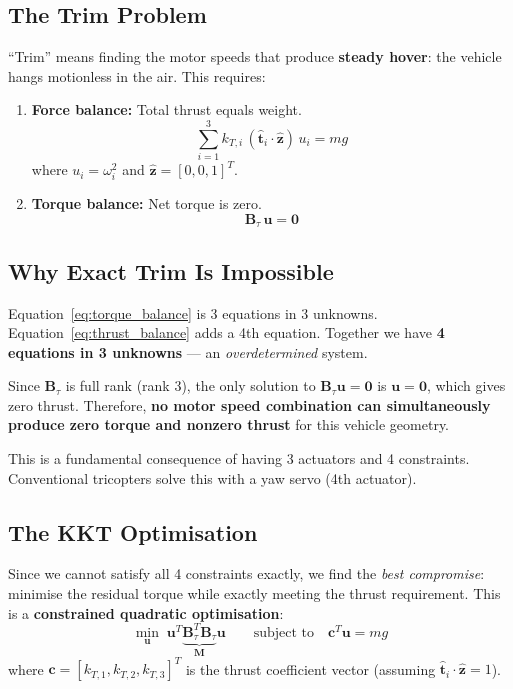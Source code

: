 \documentclass[12pt, a4paper]{article}
\newcommand{\bu}{\bm{u}}
\newcommand{\bB}{\bm{B}}
\begin{document}
\subsection{The Trim Problem}

``Trim'' means finding the motor speeds that produce \textbf{steady hover}: the vehicle hangs motionless in the air.  This requires:
\begin{enumerate}
    \item \textbf{Force balance:} Total thrust equals weight.
    \begin{equation}
        \sum_{i=1}^{3} k_{T,i} \, (\hat{\bm{t}}_i \cdot \hat{\bm{z}}) \, u_i = m g
        \label{eq:thrust_balance}
    \end{equation}
    where $u_i = \omega_i^2$ and $\hat{\bm{z}} = [0,0,1]^T$.

    \item \textbf{Torque balance:} Net torque is zero.
    \begin{equation}
        \bB_\tau \, \bu = \bm{0}
        \label{eq:torque_balance}
    \end{equation}
\end{enumerate}

\subsection{Why Exact Trim Is Impossible}

Equation~\eqref{eq:torque_balance} is 3 equations in 3 unknowns.  Equation~\eqref{eq:thrust_balance} adds a 4th equation.  Together we have \textbf{4 equations in 3 unknowns} --- an \emph{overdetermined} system.

Since $\bB_\tau$ is full rank (rank 3), the only solution to $\bB_\tau \bu = \bm{0}$ is $\bu = \bm{0}$, which gives zero thrust.  Therefore, \textbf{no motor speed combination can simultaneously produce zero torque and nonzero thrust} for this vehicle geometry.

This is a fundamental consequence of having 3 actuators and 4 constraints.  Conventional tricopters solve this with a yaw servo (4th actuator).

\subsection{The KKT Optimisation}

Since we cannot satisfy all 4 constraints exactly, we find the \emph{best compromise}: minimise the residual torque while exactly meeting the thrust requirement.  This is a \textbf{constrained quadratic optimisation}:
\begin{equation}
    \min_{\bu} \; \bu^T \underbrace{\bB_\tau^T \bB_\tau}_{\bm{M}} \bu
    \qquad \text{subject to} \quad \bm{c}^T \bu = mg
\end{equation}
where $\bm{c} = [k_{T,1}, k_{T,2}, k_{T,3}]^T$ is the thrust coefficient vector (assuming $\hat{\bm{t}}_i \cdot \hat{\bm{z}} = 1$).
\end{document}
